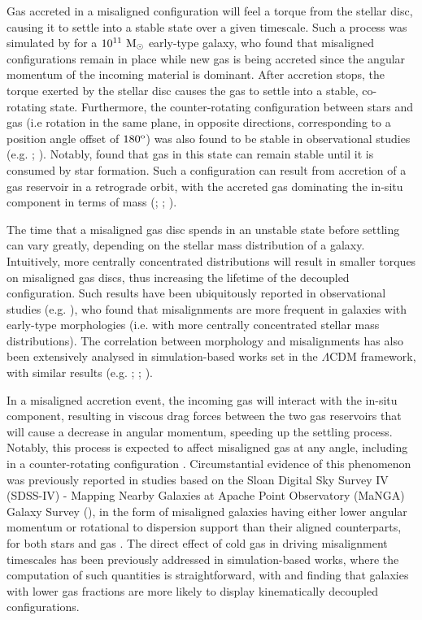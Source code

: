 \documentclass[fleqn,usenatbib]{mnras}
\begin{document}
Gas accreted in a misaligned configuration will feel a torque from the stellar disc, causing it to settle into a stable state over a given timescale. Such a process was simulated by \cite{Freekevdv2015} for a $10^{11}\ \rm{M_{\odot}}$ early-type galaxy, who found that misaligned configurations remain in place while new gas is being accreted since the angular momentum of the incoming material is dominant. After accretion stops, the torque exerted by the stellar disc causes the gas to settle into a stable, co-rotating state. Furthermore, the counter-rotating configuration between stars and gas (i.e rotation in the same plane, in opposite directions, corresponding to a position angle offset of $180^{\rm{o}}$) was also found to be stable in observational studies (e.g. \citealt{Bryant2019}; \citealt{Duckworth}). Notably, \cite{OsmanBekki2017} found that gas in this state can remain stable until it is consumed by star formation. Such a configuration can result from accretion of a gas reservoir in a retrograde orbit, with the accreted gas dominating the in-situ component in terms of mass (\citealt{Kannappan_Fabricant2001}; \citealt{Bassett2017}; \citealt{Bryant2019}). 

The time that a misaligned gas disc spends in an unstable state before settling can vary greatly, depending on the stellar mass distribution of a galaxy. Intuitively, more centrally concentrated distributions will result in smaller torques on misaligned gas discs, thus increasing the lifetime of the decoupled configuration. Such results have been ubiquitously reported in observational studies (e.g. \citealt{Davis2015,Bryant2019,Duckworth,Zhou2022}), who found that misalignments are more frequent in galaxies with early-type morphologies (i.e. with more centrally concentrated stellar mass distributions). The correlation between morphology and misalignments has also been extensively analysed in simulation-based works set in the $\Lambda$CDM framework, with similar results (e.g. \citealt{CdpLagos2015}; \citealt{Khim2020I}; \citealt{Casanueva2022}).
    
In a misaligned accretion event, the incoming gas will interact with the in-situ component, resulting in viscous drag forces between the two gas reservoirs that will cause a decrease in angular momentum, speeding up the settling process. Notably, this process is expected to affect misaligned gas at any angle, including in a counter-rotating configuration \citep{Davis2011}. Circumstantial evidence of this phenomenon was previously reported in studies based on the Sloan Digital Sky Survey IV (SDSS-IV) - Mapping Nearby Galaxies at Apache Point Observatory (MaNGA) Galaxy Survey (\citealt{Bundy2015}), in the form of misaligned galaxies having either lower angular momentum or rotational to dispersion support than their aligned counterparts, for both stars and gas \citep{Chen2016,Jin2016,Duckworth,Xu,Zhou2022}. The direct effect of cold gas in driving misalignment timescales has been previously addressed in simulation-based works, where the computation of such quantities is straightforward, with \cite{CdpLagos2015} and \cite{Khim2020I} finding that galaxies with lower gas fractions are more likely to display kinematically decoupled configurations. 
\end{document}
